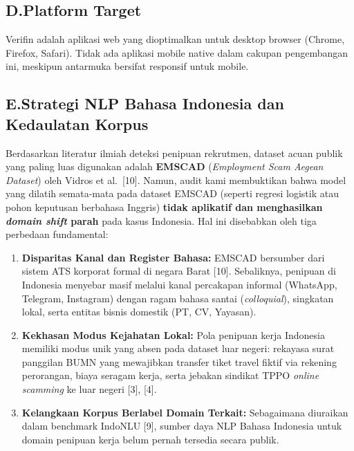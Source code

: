 \documentclass[12pt,a4paper]{article}
\begin{document}
\subsection*{D.\quad Platform Target}
Verifin adalah aplikasi web yang dioptimalkan untuk desktop browser (Chrome, Firefox, Safari).
Tidak ada aplikasi mobile native dalam cakupan pengembangan ini, meskipun antarmuka bersifat
responsif untuk mobile.

\subsection*{E.\quad Strategi NLP Bahasa Indonesia dan Kedaulatan Korpus}
{}

Berdasarkan literatur ilmiah deteksi penipuan rekrutmen, dataset acuan publik yang paling luas
digunakan adalah \textbf{EMSCAD} (\textit{Employment Scam Aegean Dataset}) oleh Vidros et al.\ [10].
Namun, audit kami membuktikan bahwa model yang dilatih semata-mata pada dataset EMSCAD (seperti regresi
logistik atau pohon keputusan berbahasa Inggris) \textbf{tidak aplikatif dan menghasilkan \textit{domain shift}
parah} pada kasus Indonesia. Hal ini disebabkan oleh tiga perbedaan fundamental:
\begin{enumerate}[label=\textbf{\alph*.}]
\item \textbf{Disparitas Kanal dan Register Bahasa:} EMSCAD bersumber dari sistem ATS korporat formal
      di negara Barat [10]. Sebaliknya, penipuan di Indonesia menyebar masif melalui kanal percakapan
      informal (WhatsApp, Telegram, Instagram) dengan ragam bahasa santai (\textit{colloquial}),
      singkatan lokal, serta entitas bisnis domestik (PT, CV, Yayasan).
\item \textbf{Kekhasan Modus Kejahatan Lokal:} Pola penipuan kerja Indonesia memiliki modus unik yang
      absen pada dataset luar negeri: rekayasa surat panggilan BUMN yang mewajibkan transfer tiket travel
      fiktif via rekening perorangan, biaya seragam kerja, serta jebakan sindikat TPPO \textit{online scamming}
      ke luar negeri [3], [4].
\item \textbf{Kelangkaan Korpus Berlabel Domain Terkait:} Sebagaimana diuraikan dalam benchmark IndoNLU [9],
      sumber daya NLP Bahasa Indonesia untuk domain penipuan kerja belum pernah tersedia secara publik.
\end{enumerate}
\end{document}
